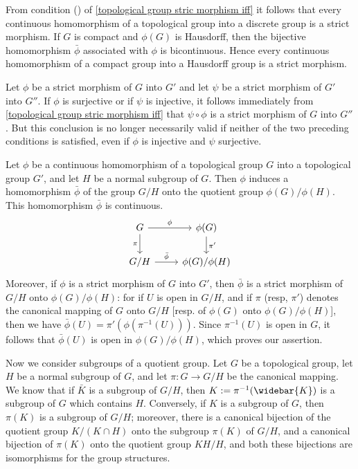 \begin{example}
From condition () of \cref{topological group stric morphism iff} it follows that every continuous homomorphism of a topological group into a discrete group is
a strict morphism. If $G$ is compact and $\phi(G)$ is Hausdorff, then the bijective homomorphism $\bar{\phi}$ associated with $\phi$ is bicontinuous. Hence every continuous homomorphism of a compact group into a Hausdorff group is a strict morphism.
\end{example}
\begin{example}
Let $\phi$ be a strict morphism of $G$ into $G'$ and let $\psi$ be a strict morphism of $G'$ into $G''$. If $\phi$ is surjective or if $\psi$ is injective, it follows immediately from \cref{topological group stric morphism iff} that $\psi\circ\phi$ is a strict morphism of $G$ into $G''$. But this conclusion is no longer necessarily valid if neither of the two preceding conditions is satisfied, even if $\phi$ is injective and $\psi$ surjective.
\end{example}
\begin{example}\label{topological group stric morphism hereditary on quotient}
Let $\phi$ be a continuous homomorphism of a topological group $G$ into a topological group $G'$, and let $H$ be a normal subgroup of $G$. Then $\phi$ induces a homomorphism $\bar{\phi}$ of the group $G/H$ onto the quotient group $\phi(G)/\phi(H)$. This homomorphism $\bar{\phi}$ is continuous.
\[\begin{tikzcd}
G\ar[r,"\phi"]\ar[d,swap,"\pi"]&\phi(G)\ar[d,"\pi'"]\\
G/H\ar[r,"\bar{\phi}"]&\phi(G)/\phi(H)
\end{tikzcd}\]
Moreover, if $\phi$ is a strict morphism of $G$ into $G'$, then $\bar{\phi}$ is a strict morphism of $G/H$ onto $\phi(G)/\phi(H)$: for if $U$ is open in $G/H$, and if $\pi$ (resp, $\pi'$) denotes the canonical mapping of $G$ onto $G/H$ [resp. of $\phi(G)$ onto $\phi(G)/\phi(H)$], then we have $\bar{\phi}(U)=\pi'(\phi(\pi^{-1}(U)))$. Since $\pi^{-1}(U)$ is open in $G$, it follows that $\bar{\phi}(U)$ is open in $\phi(G)/\phi(H)$, which proves our assertion.
\end{example}
Now we consider subgroups of a quotient group. Let $G$ be a topological group, let $H$ be a normal subgroup of $G$, and let $\pi:G\to G/H$ be the canonical mapping. We know that if $\bar{K}$ is a subgroup of $G/H$, then $K:=\pi^{-1}(\widebar{K})$ is a subgroup of $G$ which contains $H$. Conversely, if $K$ is a subgroup of $G$, then $\pi(K)$ is a subgroup of $G/H$; moreover, there is a canonical bijection of the quotient group $K/(K\cap H)$ onto the subgroup $\pi(K)$ of $G/H$, and a canonical bijection of $\pi(K)$ onto the quotient group $KH/H$, and both these bijections are isomorphisms for the group structures.
